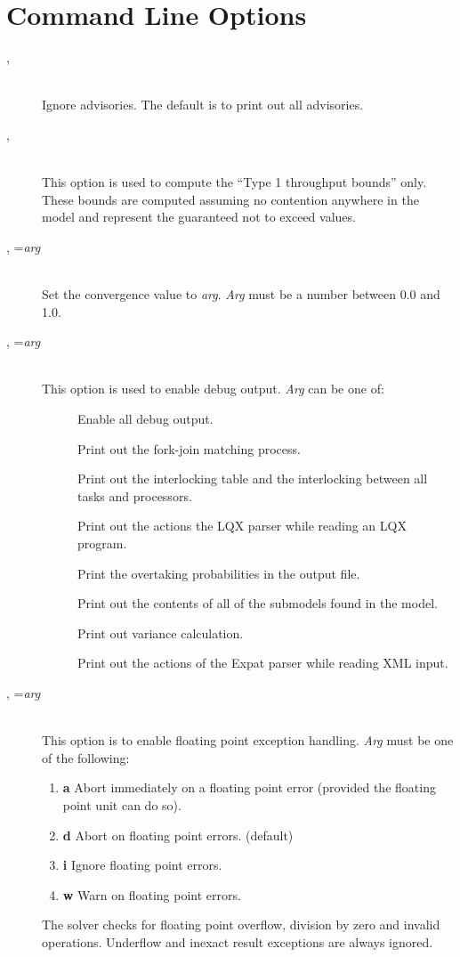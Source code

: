 \section{Command Line Options}
\label{sec:options}
\begin{description}
\item[, ]~\\
Ignore advisories.  The default is to print out all advisories.
\item[, ]~\\
This option is used to compute the ``Type 1 throughput bounds'' only.
These bounds are computed assuming no contention anywhere in the model
and represent the guaranteed not to exceed values.
\item[, =\emph{arg}]~\\
Set the convergence value to \emph{arg}.  
\emph{Arg} must be a number between 0.0 and 1.0.
\item[, =\emph{arg}]~\\
This option is used to enable debug output.
\emph{Arg} can be one of:
\begin{description}
\item[]
Enable all debug output.
\item[]
Print out the fork-join matching process.
\item[]
Print out the interlocking table and the interlocking between all tasks and processors.
\item[]
Print out the actions the LQX parser while reading an LQX program.
\item[]
Print the overtaking probabilities in the output file.
\item[]
Print out the contents of all of the submodels found in the model.
\item[]
Print out variance calculation.
\item[]
Print out the actions of the Expat parser while reading XML input.
\end{description}
\item[, =\emph{arg}]~\\
This option is to enable floating point exception handling.
\emph{Arg} must be one of the following:
\begin{enumerate}
\item \textbf{a}
Abort immediately on a floating point error (provided the floating point unit can do so).
\item \textbf{d}
Abort on floating point errors. (default)
\item \textbf{i}
Ignore floating point errors.
\item \textbf{w}
Warn on floating point errors.
\end{enumerate}
The solver checks for floating point overflow, division by zero and invalid operations.
Underflow and inexact result exceptions are always ignored.



\end{description}
